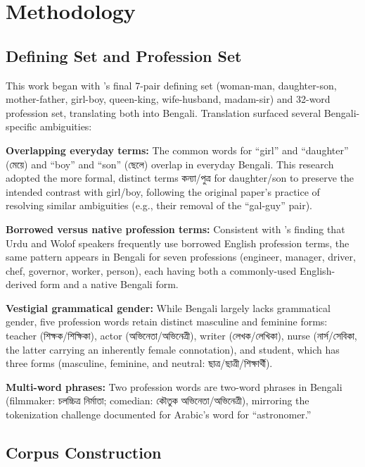 \documentclass[11pt]{article}
\newcommand{\bn}[1]{{\bengalifont #1}}
\begin{document}
\section{Methodology}

\subsection{Defining Set and Profession Set}

This work began with \citet{chen2021gender}'s final 7-pair defining set (woman-man, daughter-son, mother-father, girl-boy, queen-king, wife-husband, madam-sir) and 32-word profession set, translating both into Bengali. Translation surfaced several Bengali-specific ambiguities:

\textbf{Overlapping everyday terms:} The common words for ``girl'' and ``daughter'' (\bn{মেয়ে}) and ``boy'' and ``son'' (\bn{ছেলে}) overlap in everyday Bengali. This research adopted the more formal, distinct terms \bn{কন্যা/পুত্র} for daughter/son to preserve the intended contrast with girl/boy, following the original paper's practice of resolving similar ambiguities (e.g., their removal of the ``gal-guy'' pair).

\textbf{Borrowed versus native profession terms:} Consistent with \citet{chen2021gender}'s finding that Urdu and Wolof speakers frequently use borrowed English profession terms, the same pattern appears in Bengali for seven professions (engineer, manager, driver, chef, governor, worker, person), each having both a commonly-used English-derived form and a native Bengali form.

\textbf{Vestigial grammatical gender:} While Bengali largely lacks grammatical gender, five profession words retain distinct masculine and feminine forms: teacher (\bn{শিক্ষক/শিক্ষিকা}), actor (\bn{অভিনেতা/অভিনেত্রী}), writer (\bn{লেখক/লেখিকা}), nurse (\bn{নার্স/সেবিকা}, the latter carrying an inherently female connotation), and student, which has three forms (masculine, feminine, and neutral: \bn{ছাত্র/ছাত্রী/শিক্ষার্থী}).

\textbf{Multi-word phrases:} Two profession words are two-word phrases in Bengali (filmmaker: \bn{চলচ্চিত্র নির্মাতা}; comedian: \bn{কৌতুক অভিনেতা/অভিনেত্রী}), mirroring the tokenization challenge \citet{chen2021gender} documented for Arabic's word for ``astronomer.''

\subsection{Corpus Construction}
\end{document}
